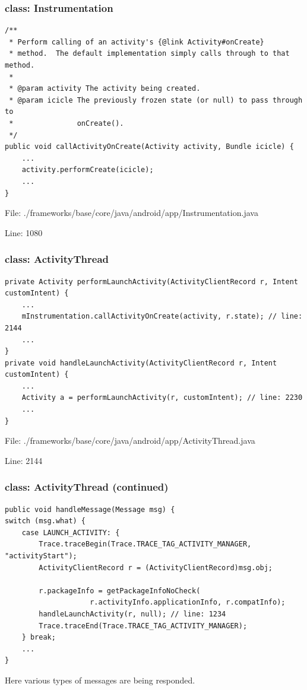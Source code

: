 \documentclass[11pt,a4paper]{beamer}
\begin{document}
\begin{frame}[fragile]
\frametitle{class: Instrumentation}

\scriptsize
\begin{verbatim}
/**
 * Perform calling of an activity's {@link Activity#onCreate}
 * method.  The default implementation simply calls through to that method.
 * 
 * @param activity The activity being created.
 * @param icicle The previously frozen state (or null) to pass through to
 *               onCreate().
 */
public void callActivityOnCreate(Activity activity, Bundle icicle) { 
    ...
    activity.performCreate(icicle);
    ...    
}
\end{verbatim}
\normalsize

File: ./frameworks/base/core/java/android/app/Instrumentation.java

Line: 1080
\end{frame}

\begin{frame}[fragile]
\frametitle{class: ActivityThread}

\scriptsize
\begin{verbatim}
private Activity performLaunchActivity(ActivityClientRecord r, Intent customIntent) {
    ...
    mInstrumentation.callActivityOnCreate(activity, r.state); // line: 2144
    ...
}
private void handleLaunchActivity(ActivityClientRecord r, Intent customIntent) {
    ...
    Activity a = performLaunchActivity(r, customIntent); // line: 2230
    ...
}
\end{verbatim}
\normalsize

File: ./frameworks/base/core/java/android/app/ActivityThread.java 

Line: 2144

\end{frame}

\begin{frame}[fragile]
\frametitle{class: ActivityThread (continued)}

\scriptsize
\begin{verbatim}
public void handleMessage(Message msg) {
switch (msg.what) {
    case LAUNCH_ACTIVITY: {
        Trace.traceBegin(Trace.TRACE_TAG_ACTIVITY_MANAGER, "activityStart");
        ActivityClientRecord r = (ActivityClientRecord)msg.obj;

        r.packageInfo = getPackageInfoNoCheck(
                    r.activityInfo.applicationInfo, r.compatInfo);
        handleLaunchActivity(r, null); // line: 1234
        Trace.traceEnd(Trace.TRACE_TAG_ACTIVITY_MANAGER);
    } break;
    ...
}
\end{verbatim}
\normalsize

Here various types of messages are being responded.

\end{frame}
\end{document}
